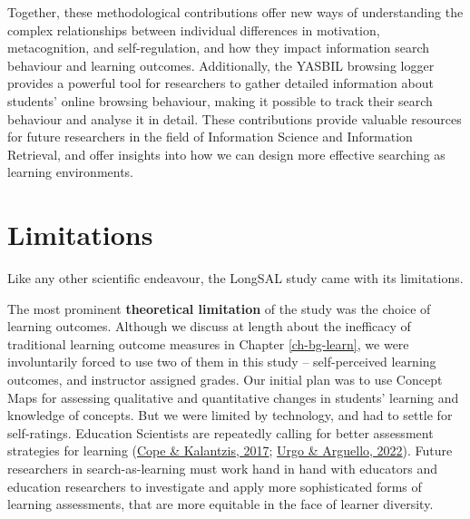\documentclass[letterpaper, nobind]{templates/ociamthesis}
\begin{document}
Together, these methodological contributions offer new ways of understanding the complex relationships between individual differences in motivation, metacognition, and self-regulation, and how they impact information search behaviour and learning outcomes. Additionally, the YASBIL browsing logger provides a powerful tool for researchers to gather detailed information about students' online browsing behaviour, making it possible to track their search behaviour and analyse it in detail. These contributions provide valuable resources for future researchers in the field of Information Science and Information Retrieval, and offer insights into how we can design more effective searching as learning environments.

\hypertarget{limitations}{%
\section{Limitations}\label{limitations}}

Like any other scientific endeavour, the LongSAL study came with its limitations.

The most prominent \textbf{theoretical limitation} of the study was the choice of learning outcomes.
Although we discuss at length about the inefficacy of traditional learning outcome measures in Chapter \ref{ch-bg-learn}, we were involuntarily forced to use two of them in this study -- self-perceived learning outcomes, and instructor assigned grades.
Our initial plan was to use Concept Maps for assessing qualitative and quantitative changes in students' learning and knowledge of concepts.
But we were limited by technology, and had to settle for self-ratings.
Education Scientists are repeatedly calling for better assessment strategies for learning (\protect\hyperlink{ref-cope2017elearningc}{Cope \& Kalantzis, 2017}; \protect\hyperlink{ref-urgo2022learning}{Urgo \& Arguello, 2022}).
Future researchers in search-as-learning must work hand in hand with educators and education researchers to investigate and apply more sophisticated forms of learning assessments, that are more equitable in the face of learner diversity.
\end{document}
